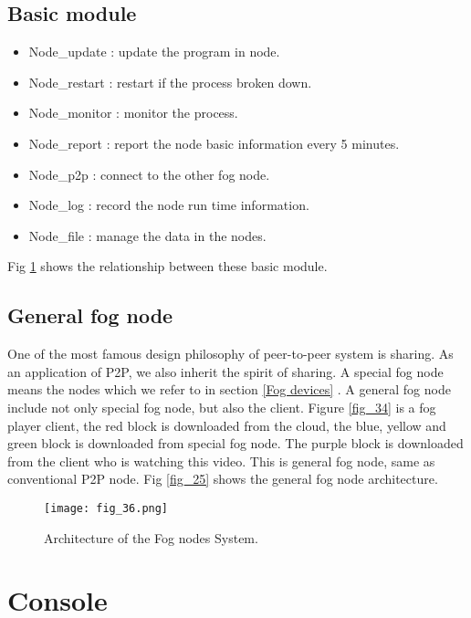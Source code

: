  \subsection{Basic module}
    \label{Basic module}
  \begin{itemize}
    \item Node\_update  : update the program in node.
    \item Node\_restart : restart if the process broken down.
    \item Node\_monitor : monitor the process.
    \item Node\_report  : report the node basic information every 5 minutes.
    \item Node\_p2p     : connect to the other fog node.
    \item Node\_log     : record the node run time information.
    \item Node\_file    : manage the data in the nodes.
  \end{itemize}

  Fig \ref{fig_36} shows the relationship between these basic module.
 \subsection{General fog node}
 One of the most famous design philosophy of peer-to-peer system is sharing. As an application of P2P,
we also inherit the spirit of sharing. A special fog node  means the nodes which we refer to in section
\ref{Fog devices} . A general fog node include not only special fog node, but also the client. Figure
\ref{fig_34} is a fog player client, the red block is downloaded from the cloud, the blue, yellow and green
block is downloaded from special fog node. The purple block is downloaded from the client who is watching
this video. This is general fog node, same as conventional P2P node.
 Fig \ref{fig_25} shows the general fog node architecture.

\begin{figure}[htbp]
\centering
	  \texttt{[image: fig\_36.png]}
    \caption{ Architecture of the Fog nodes System.}
 \label{fig_36}
\end{figure}

\section{Console}
